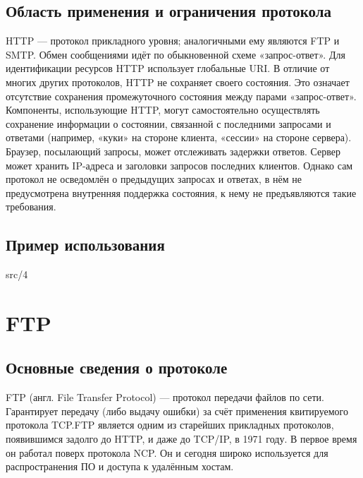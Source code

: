 \subsection{Область применения и ограничения протокола}
HTTP — протокол прикладного уровня; аналогичными ему являются FTP и SMTP. Обмен сообщениями идёт по обыкновенной схеме «запрос-ответ». Для идентификации ресурсов HTTP использует глобальные URI. В отличие от многих других протоколов, HTTP не сохраняет своего состояния. Это означает отсутствие сохранения промежуточного состояния между парами «запрос-ответ». Компоненты, использующие HTTP, могут самостоятельно осуществлять сохранение информации о состоянии, связанной с последними запросами и ответами (например, «куки» на стороне клиента, «сессии» на стороне сервера). Браузер, посылающий запросы, может отслеживать задержки ответов. Сервер может хранить IP-адреса и заголовки запросов последних клиентов. Однако сам протокол не осведомлён о предыдущих запросах и ответах, в нём не предусмотрена внутренняя поддержка состояния, к нему не предъявляются такие требования. 

\subsection{Пример использования}
 {src/4}

\section{FTP}

\subsection{Основные сведения о протоколе}
FTP (англ. File Transfer Protocol) — протокол передачи файлов по сети. Гарантирует передачу (либо выдачу ошибки) за счёт применения квитируемого протокола TCP.FTP является одним из старейших прикладных протоколов, появившимся задолго до HTTP, и даже до TCP/IP, в 1971 году. В первое время он работал поверх протокола NCP. Он и сегодня широко используется для распространения ПО и доступа к удалённым хостам. 

